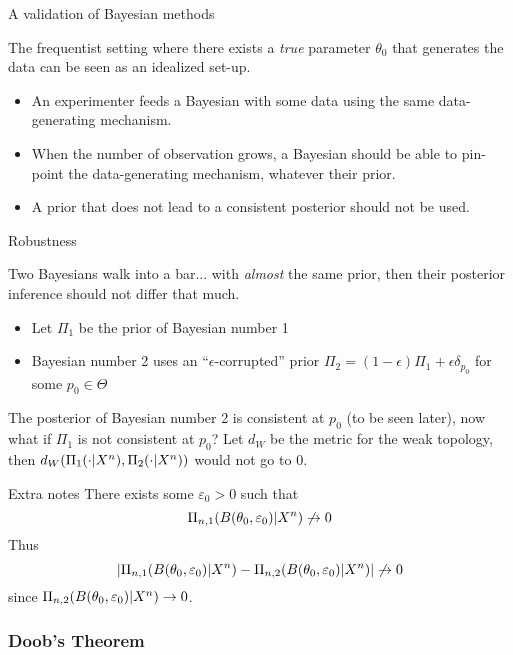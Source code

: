 \begin{frame}{A validation of Bayesian methods}

The frequentist setting where there exists a \emph{true} parameter $\theta_0$ that generates the data can be seen as an idealized set-up. 
\begin{itemize}
	\item An experimenter feeds a Bayesian with some data using the same data-generating mechanism. 
	\item When the number of observation grows, a Bayesian should be able to pin-point the data-generating mechanism, whatever their prior. 
	\item<2> \alert{A prior that does not lead to a consistent posterior should not be used.} 
\end{itemize}

\end{frame}

\begin{frame}{Robustness}

Two Bayesians walk into a bar... with \emph{almost} the same prior, then their posterior inference should not differ that much. \pause 
\begin{itemize}
\item Let $\Pi_1$ be the prior of Bayesian number 1
\item Bayesian number 2 uses an ``$\epsilon$-corrupted'' prior $\Pi_2 = (1-\epsilon)\Pi_1 + \epsilon \delta_{p_0}$ for some $p_0 \in \Theta$
\end{itemize}
The posterior of Bayesian number 2 is consistent at $p_0$ (to be seen later), now what if $\Pi_1$ is not consistent at $p_0$? 
\pause 
Let $d_W$ be the metric for the weak topology, then $d_W(\Pi_1(\cdot|X^n), \Pi_2(\cdot|X^n))$ would not go to $0$. 

\end{frame}


\begin{frame}[allowframebreaks]{Extra notes}
There exists some $\varepsilon_0 >0$ such that 
$$
\Pi_{n,1}(B(\theta_0,\varepsilon_0)|X^n) \not\to 0 
$$
Thus 
$$
|\Pi_{n,1}(B(\theta_0,\varepsilon_0)|X^n) - \Pi_{n,2}(B(\theta_0,\varepsilon_0)|X^n) | \not\to 0
$$
since $\Pi_{n,2}(B(\theta_0,\varepsilon_0)|X^n) \to 0$.
\end{frame}

\subsubsection{Doob's Theorem}



